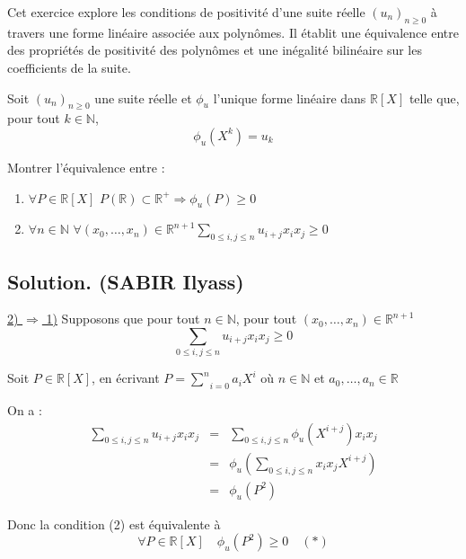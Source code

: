 Cet exercice explore les conditions de positivit{\'e} d'une suite r{\'e}elle
$(u_n)_{n \geq 0}$ {\`a} travers une forme lin{\'e}aire associ{\'e}e aux
polyn{\^o}mes. Il {\'e}tablit une {\'e}quivalence entre des propri{\'e}t{\'e}s
de positivit{\'e} des polyn{\^o}mes et une in{\'e}galit{\'e} bilin{\'e}aire
sur les coefficients de la suite.
\begin{exercise}[(Oral de l'X 2016)]
Soit $(u_n)_{n \geq 0}$ une suite r{\'e}elle et $\phi_u$ l'unique forme
lin{\'e}aire dans $\mathbb{R}[X]$ telle que, pour tout $k \in \mathbb{N}$,
\[ \phi_u (X^k) = u_k \]

Montrer l'{\'e}quivalence entre :
\begin{enumerate}
  \item $\forall P \in \mathbb{R}[X]$ $P (\mathbb{R}) \subset \mathbb{R}^+
  \Rightarrow \phi_u (P) \geq 0$
  
  \item $\forall n \in \mathbb{N}$ $\forall (x_0, \ldots, x_n) \in
  \mathbb{R}^{n + 1}  \underset{0 \leq i, j \leq n}{\sum} u_{i + j} x_i x_j
  \geq 0$
\end{enumerate}
\end{exercise}

\subsection*{Solution. (SABIR Ilyass)}


\underline{2) $\Rightarrow$ 1)} Supposons que pour tout $n \in \mathbb{N}$,
pour tout $(x_0, \ldots, x_n) \in \mathbb{R}^{n + 1}$
\[ \underset{0 \leq i, j \leq n}{\sum} u_{i + j} x_i x_j \geq 0 \]


Soit $P \in \mathbb{R}[X]$, en {\'e}crivant $P = \underset{i =
0}{\overset{n}{\sum}} a_i X^i$ o{\`u} $n \in \mathbb{N}$ et $a_0, \ldots, a_n
\in \mathbb{R}$

On a :
\begin{eqnarray*}
  \underset{0 \leq i, j \leq n}{\sum} u_{i + j} x_i x_j  & = & \underset{0
  \leq i, j \leq n}{\sum} \phi_u (X^{i + j}) x_i x_j\\
  & = & \phi_u (\sum_{0 \leq i, j \leq n} x_i x_j X^{i + j})\\
  & = & \phi_u (P^2)
\end{eqnarray*}


Donc la condition (2) est {\'e}quivalente {\`a}
\[ \forall P \in \mathbb{R}[X] \quad \phi_u (P^2) \geq 0 \quad (\ast) \]


